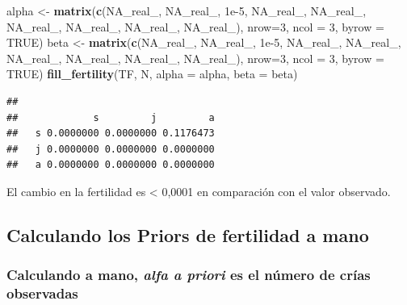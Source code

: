 \documentclass[
]{book}
\newenvironment{Shaded}{\begin{snugshade}}{\end{snugshade}}
\newcommand{\AttributeTok}[1]{\textcolor[rgb]{0.13,0.29,0.53}{#1}}
\newcommand{\ConstantTok}[1]{\textcolor[rgb]{0.56,0.35,0.01}{#1}}
\newcommand{\DecValTok}[1]{\textcolor[rgb]{0.00,0.00,0.81}{#1}}
\newcommand{\FloatTok}[1]{\textcolor[rgb]{0.00,0.00,0.81}{#1}}
\newcommand{\FunctionTok}[1]{\textcolor[rgb]{0.13,0.29,0.53}{\textbf{#1}}}
\newcommand{\NormalTok}[1]{#1}
\newcommand{\OtherTok}[1]{\textcolor[rgb]{0.56,0.35,0.01}{#1}}
\theoremstyle{definition}
\theoremstyle{definition}
\theoremstyle{definition}
\theoremstyle{definition}
\theoremstyle{remark}
\begin{document}
\begin{Shaded}
\begin{Highlighting}[]
\NormalTok{alpha }\OtherTok{\textless{}{-}} \FunctionTok{matrix}\NormalTok{(}\FunctionTok{c}\NormalTok{(}\ConstantTok{NA\_real\_}\NormalTok{, }\ConstantTok{NA\_real\_}\NormalTok{, }\FloatTok{1e{-}5}\NormalTok{,}
                  \ConstantTok{NA\_real\_}\NormalTok{, }\ConstantTok{NA\_real\_}\NormalTok{, }\ConstantTok{NA\_real\_}\NormalTok{,}
                  \ConstantTok{NA\_real\_}\NormalTok{, }\ConstantTok{NA\_real\_}\NormalTok{, }\ConstantTok{NA\_real\_}\NormalTok{), }\AttributeTok{nrow=}\DecValTok{3}\NormalTok{, }\AttributeTok{ncol =} \DecValTok{3}\NormalTok{, }\AttributeTok{byrow =} \ConstantTok{TRUE}\NormalTok{)}
\NormalTok{beta }\OtherTok{\textless{}{-}} \FunctionTok{matrix}\NormalTok{(}\FunctionTok{c}\NormalTok{(}\ConstantTok{NA\_real\_}\NormalTok{, }\ConstantTok{NA\_real\_}\NormalTok{, }\FloatTok{1e{-}5}\NormalTok{,}
                  \ConstantTok{NA\_real\_}\NormalTok{, }\ConstantTok{NA\_real\_}\NormalTok{, }\ConstantTok{NA\_real\_}\NormalTok{,}
                  \ConstantTok{NA\_real\_}\NormalTok{, }\ConstantTok{NA\_real\_}\NormalTok{, }\ConstantTok{NA\_real\_}\NormalTok{), }\AttributeTok{nrow=}\DecValTok{3}\NormalTok{, }\AttributeTok{ncol =} \DecValTok{3}\NormalTok{, }\AttributeTok{byrow =} \ConstantTok{TRUE}\NormalTok{)}
\FunctionTok{fill\_fertility}\NormalTok{(TF, N, }\AttributeTok{alpha =}\NormalTok{ alpha, }\AttributeTok{beta =}\NormalTok{ beta)}
\end{Highlighting}
\end{Shaded}

\begin{verbatim}
##    
##             s         j         a
##   s 0.0000000 0.0000000 0.1176473
##   j 0.0000000 0.0000000 0.0000000
##   a 0.0000000 0.0000000 0.0000000
\end{verbatim}

El cambio en la fertilidad es \textless{} 0,0001 en comparación con el valor
observado.

\hypertarget{calculando-los-priors-de-fertilidad-a-mano}{%
\subsection{Calculando los Priors de fertilidad a mano}\label{calculando-los-priors-de-fertilidad-a-mano}}

\hypertarget{calculando-a-mano-alfa-a-priori-es-el-nuxfamero-de-cruxedas-observadas}{%
\subsubsection{\texorpdfstring{Calculando a mano, \emph{alfa a priori} es el número de crías observadas}{Calculando a mano, alfa a priori es el número de crías observadas}}\label{calculando-a-mano-alfa-a-priori-es-el-nuxfamero-de-cruxedas-observadas}}
\end{document}
